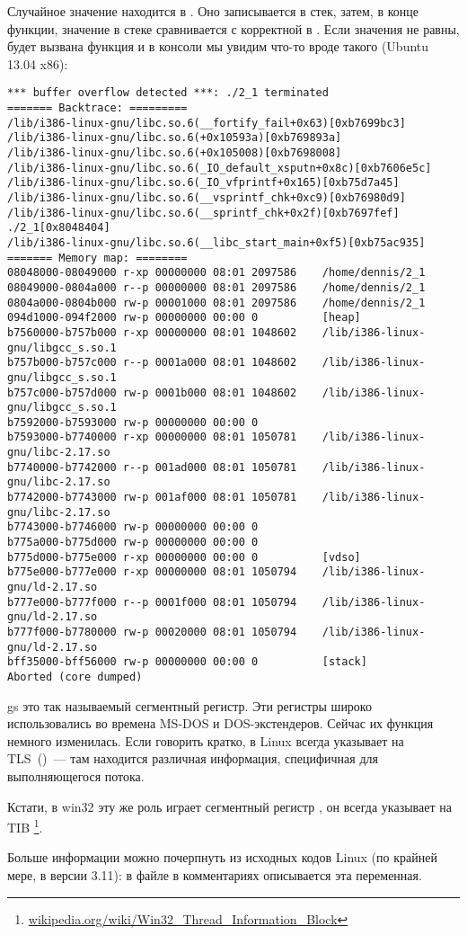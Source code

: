 Случайное значение находится в . 
Оно записывается в стек, затем, в конце функции, значение в стеке
сравнивается с корректной  в . 
Если значения не равны, будет вызвана функция 
 и в консоли мы увидим что-то вроде такого
 (Ubuntu 13.04 x86):

\begin{lstlisting}
*** buffer overflow detected ***: ./2_1 terminated
======= Backtrace: =========
/lib/i386-linux-gnu/libc.so.6(__fortify_fail+0x63)[0xb7699bc3]
/lib/i386-linux-gnu/libc.so.6(+0x10593a)[0xb769893a]
/lib/i386-linux-gnu/libc.so.6(+0x105008)[0xb7698008]
/lib/i386-linux-gnu/libc.so.6(_IO_default_xsputn+0x8c)[0xb7606e5c]
/lib/i386-linux-gnu/libc.so.6(_IO_vfprintf+0x165)[0xb75d7a45]
/lib/i386-linux-gnu/libc.so.6(__vsprintf_chk+0xc9)[0xb76980d9]
/lib/i386-linux-gnu/libc.so.6(__sprintf_chk+0x2f)[0xb7697fef]
./2_1[0x8048404]
/lib/i386-linux-gnu/libc.so.6(__libc_start_main+0xf5)[0xb75ac935]
======= Memory map: ========
08048000-08049000 r-xp 00000000 08:01 2097586    /home/dennis/2_1
08049000-0804a000 r--p 00000000 08:01 2097586    /home/dennis/2_1
0804a000-0804b000 rw-p 00001000 08:01 2097586    /home/dennis/2_1
094d1000-094f2000 rw-p 00000000 00:00 0          [heap]
b7560000-b757b000 r-xp 00000000 08:01 1048602    /lib/i386-linux-gnu/libgcc_s.so.1
b757b000-b757c000 r--p 0001a000 08:01 1048602    /lib/i386-linux-gnu/libgcc_s.so.1
b757c000-b757d000 rw-p 0001b000 08:01 1048602    /lib/i386-linux-gnu/libgcc_s.so.1
b7592000-b7593000 rw-p 00000000 00:00 0
b7593000-b7740000 r-xp 00000000 08:01 1050781    /lib/i386-linux-gnu/libc-2.17.so
b7740000-b7742000 r--p 001ad000 08:01 1050781    /lib/i386-linux-gnu/libc-2.17.so
b7742000-b7743000 rw-p 001af000 08:01 1050781    /lib/i386-linux-gnu/libc-2.17.so
b7743000-b7746000 rw-p 00000000 00:00 0
b775a000-b775d000 rw-p 00000000 00:00 0
b775d000-b775e000 r-xp 00000000 00:00 0          [vdso]
b775e000-b777e000 r-xp 00000000 08:01 1050794    /lib/i386-linux-gnu/ld-2.17.so
b777e000-b777f000 r--p 0001f000 08:01 1050794    /lib/i386-linux-gnu/ld-2.17.so
b777f000-b7780000 rw-p 00020000 08:01 1050794    /lib/i386-linux-gnu/ld-2.17.so
bff35000-bff56000 rw-p 00000000 00:00 0          [stack]
Aborted (core dumped)
\end{lstlisting}

gs это так называемый сегментный регистр. Эти регистры широко использовались во времена MS-DOS 
и DOS-экстендеров.
Сейчас их функция немного изменилась.
Если говорить кратко, в Linux  всегда указывает на \ac{TLS}~()~--- там находится различная 
информация, специфичная для выполняющегося потока.

Кстати, в win32 эту же роль играет сегментный регистр ,
он всегда указывает на
\ac{TIB} \footnote{\href{http://go.yurichev.com/17104}{wikipedia.org/wiki/Win32\_Thread\_Information\_Block}}. 

Больше информации можно почерпнуть из исходных кодов Linux (по крайней мере, в версии 3.11): 
в файле  в комментариях описывается эта переменная.


